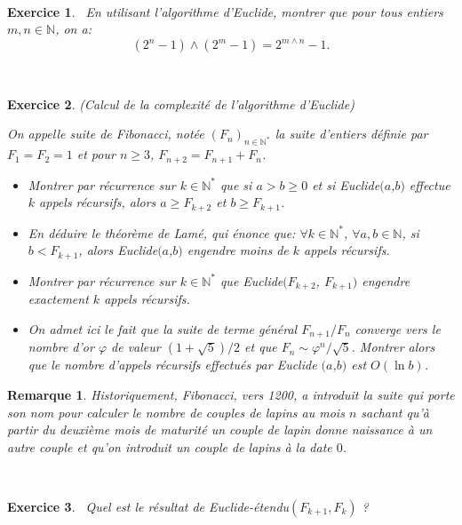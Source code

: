 \documentclass[11pt,a4paper]{article}
\newtheorem{ex}{Exercice}
\newtheorem*{rem}{Remarque}
\begin{document}
\



\begin{ex}\label{exPGCD_2n-1_2m-1}\
En utilisant l'algorithme d'Euclide, montrer que pour tous entiers $m,n \in \mathbb{N}$, on a: $$(2^n-1)\wedge(2^m-1)=2^{m\wedge n}-1.$$
\end{ex}

\


\begin{ex}(Calcul de la complexité de l'algorithme d'Euclide)

On appelle suite de Fibonacci, notée $(F_n)_{n \in \mathbb{N}^*}$ la suite d'entiers définie par $F_1=F_2=1$ et pour $n\geqslant 3$, $F_{n+2}=F_{n+1}+F_n$. 
\begin{itemize}
\item[$1.$] Montrer par récurrence sur $k \in \mathbb{N}^*$ que si $a>b \geqslant 0$ et si Euclide$(a$,$b)$ effectue $k$ appels récursifs, alors $a \geqslant F_{k+2}$ et $b \geqslant F_{k+1}$.
\item[$2.$]En déduire le théorème de Lamé, qui énonce que: $\forall k \in \mathbb{N}^*$, $\forall a,b \in \mathbb{N}$, si $b<F_{k+1}$, alors Euclide$(a$,$b)$ engendre moins de $k$ appels récursifs.
\item[$3.$] Montrer par récurrence sur $k \in \mathbb{N}^*$ que Euclide$(F_{k+2}$, $F_{k+1})$ engendre exactement $k$ appels récursifs.
\item[$4.$] On admet ici le fait que la suite de terme général $F_{n+1}/F_n$ converge vers le nombre d'or $\varphi$ de valeur $(1+\sqrt{5})/2$ et que $F_n \sim \varphi^n/\sqrt{5}$. Montrer alors que le nombre d'appels récursifs effectués par Euclide $(a$,$b)$ est $O(\ln b)$.
\end{itemize}
\end{ex}


\begin{rem}
Historiquement, Fibonacci, vers 1200, a introduit la suite qui porte son nom pour calculer le nombre de couples de lapins au mois $n$ sachant qu'à partir du deuxième mois de maturité un couple de lapin donne naissance à un autre couple et qu'on introduit un couple de lapins à la date $0$. 
\end{rem}

\



\begin{ex}\
Quel est le résultat de Euclide-étendu$(F_{k+1},F_k)$ ?
\end{ex}
\end{document}
